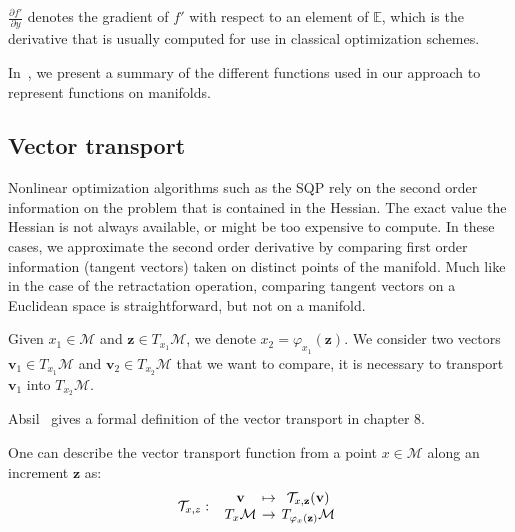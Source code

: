 $\frac{\partial f'}{\partial y}$ denotes the gradient of $f'$ with respect to an element of $\mathbb{E}$, which is the derivative that is usually computed for use in classical optimization schemes.

In~, we present a summary of the different functions used in our approach to represent functions on manifolds.

\subsection{Vector transport}
\label{sub:vector_transport}

Nonlinear optimization algorithms such as the SQP rely on the second order information on the problem that is contained in the Hessian.
The exact value the Hessian is not always available, or might be too expensive to compute.
In these cases, we approximate the second order derivative by comparing first order information (tangent vectors) taken on distinct points of the manifold.
Much like in the case of the retractation operation, comparing tangent vectors on a Euclidean space is straightforward, but not on a manifold.

Given $x_1\in\mathcal{M}$ and $\mathbf{z}\in T_{x_1}\mathcal{M}$, we denote $x_2=\varphi_{x_1}(\mathbf{z})$.
We consider two vectors $\mathbf{v}_1 \in T_{x_1}\mathcal{M}$ and $\mathbf{v}_2 \in T_{x_2}\mathcal{M}$ that we want to compare, it is necessary to transport $\mathbf{v}_1$ into $T_{x_2}\mathcal{M}$.

Absil~\cite{absil:book:2008} gives a formal definition of the vector transport in chapter 8.

One can describe the vector transport function from a point $x\in \mathcal{M}$ along an increment $\mathbf{z}$ as:
\begin{equation}
  \mathcal{T}_{x,z} :\
  \begin{array}{ccc}
    \mathbf{v} & \reduce{\mapsto}{6} & \mathcal{T}_{x,\mathbf{z}}(\mathbf{v}) \\
    T_x\mathcal{M} & \reduce{\rightarrow}{6} & T_{\varphi_x(\mathbf{z})}\mathcal{M}
  \end{array} \nonumber%
\end{equation}




